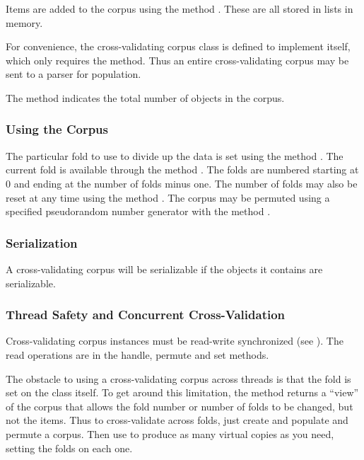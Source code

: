 Items are added to the corpus using the method .
These are all stored in lists in memory.  

For convenience, the cross-validating corpus class is defined to
implement  itself, which only requires the
 method.  Thus an entire cross-validating corpus may
be sent to a parser for population.

The  method indicates the total number of objects in the
corpus.

\subsubsection{Using the Corpus}

The particular fold to use to divide up the data is set using the
method .  The current fold is available through the
method .  The folds are numbered starting at 0 and ending
at the number of folds minus one.  The number of folds may also be
reset at any time using the method .  The corpus
may be permuted using a specified pseudorandom number generator with
the method .



\subsubsection{Serialization}

A cross-validating corpus will be serializable if the objects
it contains are serializable.  


\subsubsection{Thread Safety and Concurrent Cross-Validation}

Cross-validating corpus instances must be read-write synchronized (see
).  The read operations are in
the handle, permute and set methods.

The obstacle to using a cross-validating corpus across threads is that
the fold is set on the class itself.  To get around this limitation,
the method  returns a ``view'' of the corpus that
allows the fold number or number of folds to be changed, but not the
items.  Thus to cross-validate across folds, just create and populate
and permute a corpus.  Then use  to produce as
many virtual copies as you need, setting the folds on each one.  

